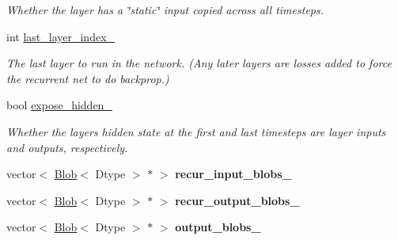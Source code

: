 \begin{DoxyCompactItemize}
\begin{DoxyCompactList}\small\item\em Whether the layer has a \char`\"{}static\char`\"{} input copied across all timesteps. \end{DoxyCompactList}\item 
int \hyperlink{classcaffe_1_1RecurrentLayer_a0a7a7d94ed74d4199b9d7b8445d5aadb}{last\+\_\+layer\+\_\+index\+\_\+}\hypertarget{classcaffe_1_1RecurrentLayer_a0a7a7d94ed74d4199b9d7b8445d5aadb}{}\label{classcaffe_1_1RecurrentLayer_a0a7a7d94ed74d4199b9d7b8445d5aadb}

\begin{DoxyCompactList}\small\item\em The last layer to run in the network. (Any later layers are losses added to force the recurrent net to do backprop.) \end{DoxyCompactList}\item 
bool \hyperlink{classcaffe_1_1RecurrentLayer_abfafaacb1fece0309e750e0d307fb76e}{expose\+\_\+hidden\+\_\+}\hypertarget{classcaffe_1_1RecurrentLayer_abfafaacb1fece0309e750e0d307fb76e}{}\label{classcaffe_1_1RecurrentLayer_abfafaacb1fece0309e750e0d307fb76e}

\begin{DoxyCompactList}\small\item\em Whether the layer\textquotesingle{}s hidden state at the first and last timesteps are layer inputs and outputs, respectively. \end{DoxyCompactList}\item 
vector$<$ \hyperlink{classcaffe_1_1Blob}{Blob}$<$ Dtype $>$ $\ast$ $>$ {\bfseries recur\+\_\+input\+\_\+blobs\+\_\+}\hypertarget{classcaffe_1_1RecurrentLayer_a9da1173c6ccdb913c5a8ac8f4ca7f891}{}\label{classcaffe_1_1RecurrentLayer_a9da1173c6ccdb913c5a8ac8f4ca7f891}

\item 
vector$<$ \hyperlink{classcaffe_1_1Blob}{Blob}$<$ Dtype $>$ $\ast$ $>$ {\bfseries recur\+\_\+output\+\_\+blobs\+\_\+}\hypertarget{classcaffe_1_1RecurrentLayer_a53b1f9cd694e7dfcae00774ddfef0222}{}\label{classcaffe_1_1RecurrentLayer_a53b1f9cd694e7dfcae00774ddfef0222}

\item 
vector$<$ \hyperlink{classcaffe_1_1Blob}{Blob}$<$ Dtype $>$ $\ast$ $>$ {\bfseries output\+\_\+blobs\+\_\+}\hypertarget{classcaffe_1_1RecurrentLayer_ae0b7323dd7121854d05f85847e2f86c4}{}\label{classcaffe_1_1RecurrentLayer_ae0b7323dd7121854d05f85847e2f86c4}


\end{DoxyCompactItemize}
